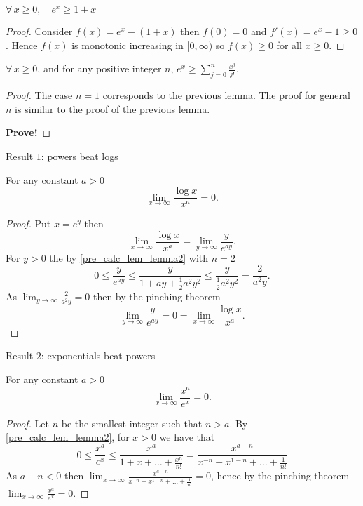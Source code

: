 \documentclass[10pt, a4paper]{article}
\begin{document}
\begin{lemma}\label{pre_calc_lem_lemma1}
    $\forall\, x \geq 0,\quad e ^ x \geq 1 + x$
    \begin{proof}
        Consider $f(x) = e ^ x - (1 + x)$ then $f(0) = 0$ and $f'(x) = e ^ x - 1 \geq 0$.
        Hence $f(x)$ is monotonic increasing in $[0, \infty)$ so $f(x) \geq 0$ for all $x \geq 0$.
    \end{proof}
\end{lemma}

\begin{lemma}\label{pre_calc_lem_lemma2}
    $\forall\, x \geq 0$,
    and for any positive integer $n$,
    $e ^ x \geq \sum_{j = 0}^{n}\frac{x ^ j}{j!}$.
    \begin{proof}
    The case $n = 1$ corresponds to the previous lemma.
    The proof for general $n$ is similar to the proof of the previous lemma.
    
    \Large\textbf{Prove!}
    \end{proof}
\end{lemma}

Result $1$: powers beat logs

For any constant $a > 0$
\[
\lim_{x \rightarrow \infty}\frac{\log x}{x ^ a} = 0.
\]
\begin{proof}
    Put $x = e ^ y$ then
    \[
    \lim_{x \rightarrow \infty}\frac{\log x}{x ^ a} = \lim_{y \rightarrow \infty}\frac{y}{e ^ {ay}}.
    \]
    For $y > 0$ the by \autoref{pre_calc_lem_lemma2} with $n = 2$
    \[
    0 \leq \frac{y}{e ^ {ay}} \leq \frac{y}{1 + ay + \frac{1}{2}a ^ 2 y ^ 2} \leq \frac{y}{\frac{1}{2}a ^ 2 y ^ 2} = \frac{2}{a ^ 2 y}.
    \]
    As $\lim_{y \rightarrow \infty}\frac{2}{a ^ 2 y} = 0$ then by the pinching theorem
    \[
    \lim_{y \rightarrow \infty}\frac{y}{e ^ {ay}} = 0 = \lim_{x \rightarrow \infty}\frac{\log x}{x ^ a}.
    \]
\end{proof}

Result $2$: exponentials beat powers

For any constant $a > 0$
\[
\lim_{x \rightarrow \infty}\frac{x ^ a}{e ^ x} = 0.
\]
\begin{proof}
    Let $n$ be the smallest integer such that $n > a$.
    By \autoref{pre_calc_lem_lemma2},
    for $x > 0$ we have that
    \[
    0 \leq \frac{x ^ a}{e ^ x} \leq \frac{x ^ a}{1 + x + \dotsc + \frac{x ^ n}{n!}} = \frac{x ^ {a - n}}{x ^ {-n} + x ^ {1 - n} + \dotsc + \frac{1}{n!}}
    \]
    As $a - n < 0$ then $\lim_{x \rightarrow \infty}\frac{x ^ {a - n}}{x ^ {-n} + x ^ {1 - n} + \dotsc + \frac{1}{n!}} = 0$,
    hence by the pinching theorem $\lim_{x \rightarrow \infty}\frac{x ^ a}{e ^ x} = 0$.
\end{proof}
\end{document}
